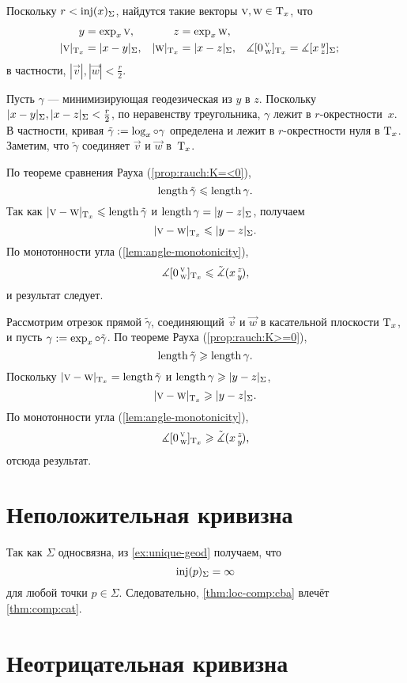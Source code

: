 Поскольку $r<\mathop{\rm inj}\nolimits(x)_\Sigma$, найдутся такие векторы $\text{\sc{v}},\text{\sc{w}}\in\mathrm{T}_x$, что 
\begin{align*}
y&=\exp_x\vec v,
& 
z&=\exp_x\vec w,
\\
|\vec v|_{\T_x}&=\dist{x}{y}\Sigma,
&
|\vec w|_{\T_x}&=\dist{x}{z}\Sigma,
&
\measuredangle\hinge 0{\vec v}{\vec w}_{\T_x}&=\measuredangle\hinge xyz_\Sigma;
\end{align*}
в частности, $|\vec v|, |\vec w|< \tfrac r2$.

Пусть $\gamma$ --- минимизирующая геодезическая из $y$ в $z$.
Поскольку $\dist{x}{y}{\Sigma},\dist{x}{z}{\Sigma}\z<\tfrac r2$, по неравенству треугольника, $\gamma$ лежит в $r$-окрестности~$x$.
В частности, кривая
$\tilde \gamma\mathrel{:=}\log_x\circ\gamma$ определена и лежит в $r$-окрестности нуля в $\mathrm{T}_x$.
Заметим, что $\tilde\gamma$ соединяет $\vec v$ и $\vec w$ в~$\mathrm{T}_x$.

По теореме сравнения Рауха (\ref{prop:rauch:K=<0}),
\[\mathop{\rm length}\nolimits \tilde \gamma\leqslant \mathop{\rm length}\nolimits\gamma.\]
Так как $\dist{\vec v}{\vec w}{\T_x}\le\length\tilde \gamma$ и $\length\gamma=\dist{y}{z}{\Sigma}$, получаем 
\[\dist{\vec v}{\vec w}{\T_x}\le \dist{y}{z}\Sigma.\]
По монотонности угла (\ref{lem:angle-monotonicity}), 
\[\measuredangle[0\,{}^{\text{\sc{v}}}_{\text{\sc{w}}}]_{\mathrm{T}_x}\leqslant \tilde\measuredangle(x\,{}^{z}_{y}\hspace{-0.2ex}),\]
и результат следует.

Рассмотрим отрезок прямой $\tilde \gamma$, соединяющий $\vec v$ и $\vec w$ в касательной плоскости $\mathrm{T}_x$, и пусть $\gamma\mathrel{:=}\exp_x\circ\tilde \gamma$.
По теореме Рауха (\ref{prop:rauch:K>=0}), 
\[\mathop{\rm length}\nolimits \tilde \gamma\geqslant\mathop{\rm length}\nolimits\gamma.\]
Поскольку $\dist{\vec v}{\vec w}{\T_x}=\length\tilde \gamma$ и $\length\gamma\ge\dist{y}{z}\Sigma$, 
\[\dist{\vec v}{\vec w}{\T_x}\ge \dist{y}{z}\Sigma.\]
По монотонности угла (\ref{lem:angle-monotonicity}), 
\[\measuredangle[0\,{}^{\text{\sc{v}}}_{\text{\sc{w}}}]_{\mathrm{T}_x}\geqslant\tilde\measuredangle(x\,{}^{z}_{y}\hspace{-0.2ex}),\]
отсюда результат.
\qeds


\section{Неположительная кривизна}\label{sec:nonpos-comp}

Так как $\Sigma$  односвязна, из \ref{ex:unique-geod} получаем, что 
\[\mathop{\rm inj}\nolimits(p)_\Sigma=\infty\]
для любой точки $p\in\Sigma$.
Следовательно, \ref{thm:loc-comp:cba} влечёт \ref{thm:comp:cat}.
\qeds

\section{Неотрицательная кривизна}\label{sec:nonneg-comp}

